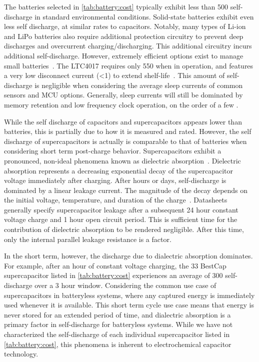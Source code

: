 The batteries selected in \cref{tab:battery:cost} typically exhibit less than 500\ssi{\nano\ampere} self-discharge in standard environmental conditions. Solid-state batteries exhibit even less self discharge, at similar rates to capacitors. Notably, many types of Li-ion and LiPo batteries also require additional protection circuitry to prevent deep discharges and overcurrent charging/discharging. This additional circuitry incurs additional self-discharge. However, extremely efficient options exist to manage small batteries~\cite{ltc4071Datasheet,bq25505,adp5091}. The LTC4017 requires only 550\ssi{\nano\ampere} when in operation, and features a very low disconnect current (<1\ssi{\nano\ampere}) to extend shelf-life~\cite{ltc4071Datasheet}.
This amount of self-discharge is negligible when considering the average sleep currents of common sensors and MCU options. Generally, sleep currents will still be dominated by memory retention and low frequency clock operation, on the order of a few \ssi{\micro\ampere}. 

While the self discharge of capacitors and supercapacitors appears lower than batteries, this is partially due to how it is measured and rated. However, the self discharge of supercapacitors is actually is comparable to that of batteries when considering short term post-charge behavior.
Supercapacitors exhibit a pronounced, non-ideal phenomena known as dielectric absorption~\cite{kundert2008modeling}. Dielectric absorption represents a decreasing exponential decay of the supercapacitor voltage immediately after charging. After hours or days, self-discharge is dominated by a linear leakage current. The magnitude of the decay depends on the initial voltage, temperature, and duration of the charge~\cite{kowal2011detailed}. Datasheets generally specify supercapacitor leakage after a subsequent 24 hour constant voltage charge and 1 hour open circuit period. This is sufficient time for the contribution of dielectric absorption to be rendered negligible. After this time, only the internal parallel leakage resistance is a factor.

In the short term, however, the discharge due to dialectric absorption dominates. For example, after an hour of constant voltage charging, the 33\ssi{\milli\farad} BestCap supercapacitor listed in \cref{tab:battery:cost} experiences an average of 300\ssi{\nano\ampere} self-discharge over a 3 hour window. Considering the common use case of supercapacitors in batteryless systems, where any captured energy is immediately used whenever it is available. This short term cycle use case means that energy is never stored for an extended period of time, and dialectric absorption is a primary factor in self-discharge for batteryless systems. While we have not characterized the self-discharge of each individual supercapacitor listed in \cref{tab:battery:cost}, this phenomena is inherent to electrochemical capacitor technology.

